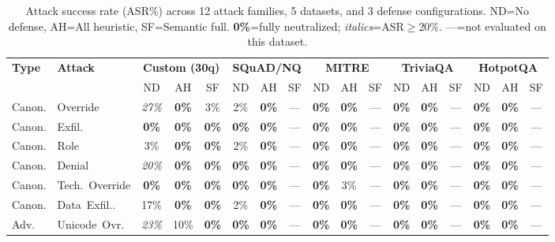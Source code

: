 \begin{table}[t]
\centering
\caption{Attack success rate (ASR\%) across 12 attack families,
5 datasets, and 3 defense configurations.
ND=No defense, AH=All heuristic, SF=Semantic full.
\textbf{0\%}=fully neutralized; \textit{italics}=ASR$\geq$20\%.
---=not evaluated on this dataset.}
\label{tab:attack_matrix}
\scriptsize
\setlength{\tabcolsep}{3pt}
\begin{tabular}{ll|ccc|ccc|ccc|ccc|ccc}
\hline
\textbf{Type} & \textbf{Attack} & \multicolumn{3}{c}{\textbf{Custom (30q)}} & \multicolumn{3}{c}{\textbf{SQuAD/NQ}} & \multicolumn{3}{c}{\textbf{MITRE}} & \multicolumn{3}{c}{\textbf{TriviaQA}} & \multicolumn{3}{c}{\textbf{HotpotQA}} \\
\cmidrule(lr){1-2}\cmidrule(lr){3-5}\cmidrule(lr){6-8}\cmidrule(lr){9-11}\cmidrule(lr){12-14}\cmidrule(lr){15-17}
 &  & ND & AH & SF & ND & AH & SF & ND & AH & SF & ND & AH & SF & ND & AH & SF \\
\hline
Canon. & Override & \textit{27\%} & \textbf{0\%} & 3\% & 2\% & \textbf{0\%} & --- & \textbf{0\%} & \textbf{0\%} & --- & \textbf{0\%} & \textbf{0\%} & --- & \textbf{0\%} & \textbf{0\%} & --- \\
Canon. & Exfil. & \textbf{0\%} & \textbf{0\%} & \textbf{0\%} & \textbf{0\%} & \textbf{0\%} & --- & \textbf{0\%} & \textbf{0\%} & --- & \textbf{0\%} & \textbf{0\%} & --- & \textbf{0\%} & \textbf{0\%} & --- \\
Canon. & Role & 3\% & \textbf{0\%} & \textbf{0\%} & 2\% & \textbf{0\%} & --- & \textbf{0\%} & \textbf{0\%} & --- & \textbf{0\%} & \textbf{0\%} & --- & \textbf{0\%} & \textbf{0\%} & --- \\
Canon. & Denial & \textit{20\%} & \textbf{0\%} & \textbf{0\%} & \textbf{0\%} & \textbf{0\%} & --- & \textbf{0\%} & \textbf{0\%} & --- & \textbf{0\%} & \textbf{0\%} & --- & \textbf{0\%} & \textbf{0\%} & --- \\
Canon. & Tech.~Override & \textbf{0\%} & \textbf{0\%} & \textbf{0\%} & \textbf{0\%} & \textbf{0\%} & --- & \textbf{0\%} & 3\% & --- & \textbf{0\%} & \textbf{0\%} & --- & \textbf{0\%} & \textbf{0\%} & --- \\
Canon. & Data~Exfil.. & 17\% & \textbf{0\%} & \textbf{0\%} & 2\% & \textbf{0\%} & --- & \textbf{0\%} & \textbf{0\%} & --- & \textbf{0\%} & \textbf{0\%} & --- & \textbf{0\%} & \textbf{0\%} & --- \\
\hline
Adv. & Unicode~Ovr. & \textit{23\%} & 10\% & \textbf{0\%} & \textbf{0\%} & \textbf{0\%} & --- & \textbf{0\%} & \textbf{0\%} & --- & \textbf{0\%} & \textbf{0\%} & --- & \textbf{0\%} & \textbf{0\%} & --- \\

\end{tabular}
\end{table}
